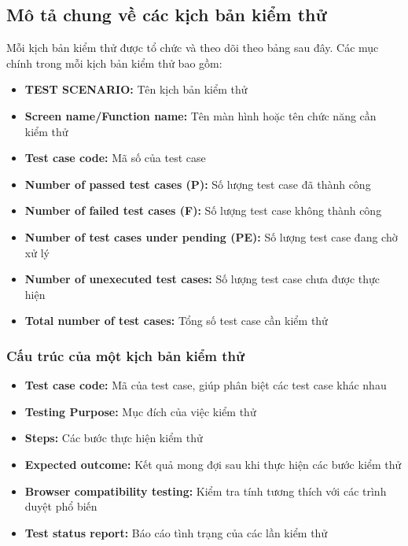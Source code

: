 \subsection{Mô tả chung về các kịch bản kiểm thử}

Mỗi kịch bản kiểm thử được tổ chức và theo dõi theo bảng sau đây. Các mục chính trong mỗi kịch bản kiểm thử bao gồm:
\begin{itemize}
    \item \textbf{TEST SCENARIO:} Tên kịch bản kiểm thử
    \item \textbf{Screen name/Function name:} Tên màn hình hoặc tên chức năng cần kiểm thử
    \item \textbf{Test case code:} Mã số của test case
    \item \textbf{Number of passed test cases (P):} Số lượng test case đã thành công
    \item \textbf{Number of failed test cases (F):} Số lượng test case không thành công
    \item \textbf{Number of test cases under pending (PE):} Số lượng test case đang chờ xử lý
    \item \textbf{Number of unexecuted test cases:} Số lượng test case chưa được thực hiện
    \item \textbf{Total number of test cases:} Tổng số test case cần kiểm thử
\end{itemize}

\subsubsection{Cấu trúc của một kịch bản kiểm thử}

\begin{itemize}
    \item \textbf{Test case code:} Mã của test case, giúp phân biệt các test case khác nhau
    \item \textbf{Testing Purpose:} Mục đích của việc kiểm thử
    \item \textbf{Steps:} Các bước thực hiện kiểm thử
    \item \textbf{Expected outcome:} Kết quả mong đợi sau khi thực hiện các bước kiểm thử
    \item \textbf{Browser compatibility testing:} Kiểm tra tính tương thích với các trình duyệt phổ biến
    \item \textbf{Test status report:} Báo cáo tình trạng của các lần kiểm thử
\end{itemize}

